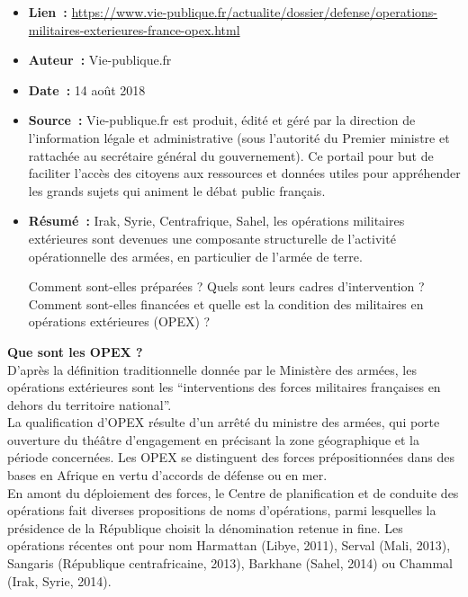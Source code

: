 \documentclass[8pt]{article}
\begin{document}
\begin{itemize}
	\item \textbf{Lien~: }  \url{https://www.vie-publique.fr/actualite/dossier/defense/operations-militaires-exterieures-france-opex.html} 
	\item \textbf{Auteur~: } Vie-publique.fr
	\item \textbf{Date~: } 14 août 2018 
	\item \textbf{Source~: } Vie-publique.fr est produit, édité et géré par la direction de l'information légale et administrative (sous l'autorité du Premier ministre et rattachée au secrétaire général du gouvernement). Ce portail pour but de faciliter l’accès des citoyens aux ressources et données utiles pour appréhender les grands sujets qui animent le débat public français. 
	\item \textbf{Résumé~: }Irak, Syrie, Centrafrique, Sahel, les opérations militaires extérieures sont devenues une composante structurelle de l’activité opérationnelle des armées, en particulier de l’armée de terre.
	
	Comment sont-elles préparées ? Quels sont leurs cadres d’intervention ? Comment sont-elles financées et quelle est la condition des militaires en opérations extérieures (OPEX) ?
\end{itemize}

\textbf{Que sont les OPEX ?} \\

D’après la définition traditionnelle donnée par le Ministère des armées, les opérations extérieures sont les “interventions des forces militaires françaises en dehors du territoire national”.\\

La qualification d’OPEX résulte d’un arrêté du ministre des armées, qui porte ouverture du théâtre d’engagement en précisant la zone géographique et la période concernées. Les OPEX se distinguent des forces prépositionnées dans des bases en Afrique en vertu d’accords de défense ou en mer.\\

En amont du déploiement des forces, le Centre de planification et de conduite des opérations fait diverses propositions de noms d’opérations, parmi lesquelles la présidence de la République choisit la dénomination retenue in fine. Les opérations récentes ont pour nom Harmattan (Libye, 2011), Serval (Mali, 2013), Sangaris (République centrafricaine, 2013), Barkhane (Sahel, 2014) ou Chammal (Irak, Syrie, 2014).\\
\end{document}

